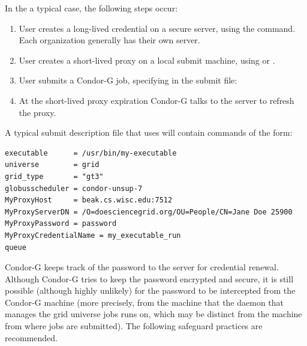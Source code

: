 In the a typical case, the following steps occur:

\begin{enumerate}
\item{User creates a long-lived credential}
on a secure  server, using the
 command.
Each organization generally has their own  server.

\item{User creates a short-lived proxy}
on a local submit machine,
using
 or .

\item{User submits}
a Condor-G job,
specifying in the submit file:

\item{At the short-lived proxy expiration}
Condor-G talks to
the  server to refresh the proxy.

\end{enumerate}

A typical submit description file that uses  will
contain commands of the form:
\footnotesize
\begin{verbatim}
executable      = /usr/bin/my-executable
universe        = grid
grid_type       = "gt3"
globusscheduler = condor-unsup-7
MyProxyHost     = beak.cs.wisc.edu:7512
MyProxyServerDN = /O=doesciencegrid.org/OU=People/CN=Jane Doe 25900
MyProxyPassword = password
MyProxyCredentialName = my_executable_run
queue
\end{verbatim}
\normalsize

Condor-G keeps track of the password to the  server
for credential renewal.
Although Condor-G tries to keep the password encrypted and secure,
it is still possible (although highly unlikely) for the password
to be intercepted from the Condor-G machine
(more precisely, from the machine that the
 daemon that manages the grid universe jobs runs on,
which may be distinct from the machine from where jobs are submitted).
The following safeguard practices are recommended.

